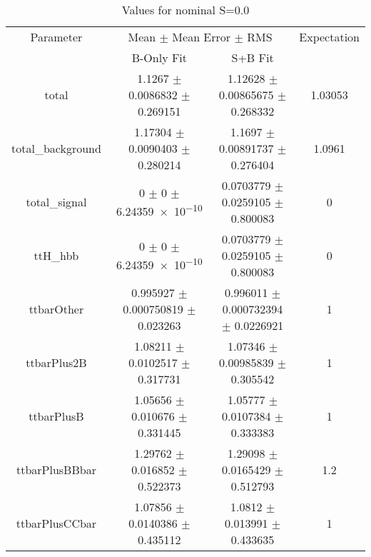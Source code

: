 \begin{table}
\centering
\caption{Values for nominal S=0.0}
\begin{tabular}{cccc}
\toprule
Parameter & \multicolumn{2}{c}{Mean $\pm$ Mean Error $\pm$ RMS} & Expectation\\
 & B-Only Fit & S+B Fit & \\
\midrule
total & \num{1.1267} $\pm$ \num{0.0086832} $\pm$ \num{0.269151} & \num{1.12628} $\pm$ \num{0.00865675} $\pm$ \num{0.268332} & \num{1.03053}\\
total\_background & \num{1.17304} $\pm$ \num{0.0090403} $\pm$ \num{0.280214} & \num{1.1697} $\pm$ \num{0.00891737} $\pm$ \num{0.276404} & \num{1.0961}\\
total\_signal & \num{0} $\pm$ \num{0} $\pm$ \num{6.24359e-10} & \num{0.0703779} $\pm$ \num{0.0259105} $\pm$ \num{0.800083} & \num{0}\\
ttH\_hbb & \num{0} $\pm$ \num{0} $\pm$ \num{6.24359e-10} & \num{0.0703779} $\pm$ \num{0.0259105} $\pm$ \num{0.800083} & \num{0}\\
ttbarOther & \num{0.995927} $\pm$ \num{0.000750819} $\pm$ \num{0.023263} & \num{0.996011} $\pm$ \num{0.000732394} $\pm$ \num{0.0226921} & \num{1}\\
ttbarPlus2B & \num{1.08211} $\pm$ \num{0.0102517} $\pm$ \num{0.317731} & \num{1.07346} $\pm$ \num{0.00985839} $\pm$ \num{0.305542} & \num{1}\\
ttbarPlusB & \num{1.05656} $\pm$ \num{0.010676} $\pm$ \num{0.331445} & \num{1.05777} $\pm$ \num{0.0107384} $\pm$ \num{0.333383} & \num{1}\\
ttbarPlusBBbar & \num{1.29762} $\pm$ \num{0.016852} $\pm$ \num{0.522373} & \num{1.29098} $\pm$ \num{0.0165429} $\pm$ \num{0.512793} & \num{1.2}\\
ttbarPlusCCbar & \num{1.07856} $\pm$ \num{0.0140386} $\pm$ \num{0.435112} & \num{1.0812} $\pm$ \num{0.013991} $\pm$ \num{0.433635} & \num{1}\\
\bottomrule
\end{tabular}
\end{table}